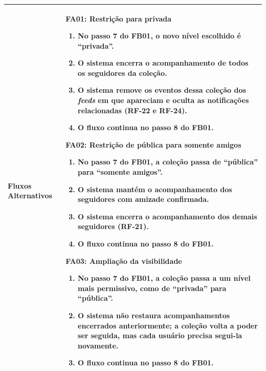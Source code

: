 \begin{longtable}{ >{\raggedright}p{2.8cm} | >{\raggedright\arraybackslash}p{10.7cm} }
Fluxos Alternativos & \mbox{}
\textbf{FA01:} Restrição para privada
\vspace{2pt}
\begin{enumerate}[nosep,leftmargin=1.2em,topsep=0pt,partopsep=0pt,parsep=0pt,itemsep=0pt,after=\vspace{2pt}]
    \item No passo 7 do FB01, o novo nível escolhido é ``privada''.
    \item O sistema encerra o acompanhamento de todos os seguidores da coleção.
    \item O sistema remove os eventos dessa coleção dos \textit{feeds} em que apareciam e oculta as notificações relacionadas (RF-22 e RF-24).
    \item O fluxo continua no passo 8 do FB01.
\end{enumerate}

\textbf{FA02:} Restrição de pública para somente amigos
\vspace{2pt}
\begin{enumerate}[nosep,leftmargin=1.2em,topsep=0pt,partopsep=0pt,parsep=0pt,itemsep=0pt,after=\vspace{2pt}]
    \item No passo 7 do FB01, a coleção passa de ``pública'' para ``somente amigos''.
    \item O sistema mantém o acompanhamento dos seguidores com amizade confirmada.
    \item O sistema encerra o acompanhamento dos demais seguidores (RF-21).
    \item O fluxo continua no passo 8 do FB01.
\end{enumerate}

\textbf{FA03:} Ampliação da visibilidade
\vspace{2pt}
\begin{enumerate}[nosep,leftmargin=1.2em,topsep=0pt,partopsep=0pt,parsep=0pt,itemsep=0pt,after=\vspace{2pt}]
    \item No passo 7 do FB01, a coleção passa a um nível mais permissivo, como de ``privada'' para ``pública''.
    \item O sistema não restaura acompanhamentos encerrados anteriormente; a coleção volta a poder ser seguida, mas cada usuário precisa segui-la novamente.
    \item O fluxo continua no passo 8 do FB01.
\end{enumerate}
\mbox{} \\ \hline


\end{longtable}
